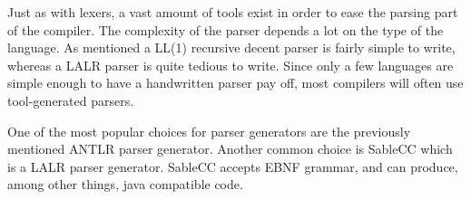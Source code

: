 Just as with lexers, a vast amount of tools exist in order to ease the parsing part of the compiler. 
The complexity of the parser depends a lot on the type of the language. 
As mentioned a LL(1) recursive decent parser is fairly simple to write, whereas a LALR parser is quite tedious to write. 
Since only a few languages are simple enough to have a handwritten parser pay off, most compilers will often use tool-generated parsers.

One of the most popular choices for parser generators are the previously mentioned ANTLR parser generator. 
Another common choice is SableCC which is a LALR parser generator.
SableCC accepts EBNF grammar, and can produce, among other things, java compatible code.
